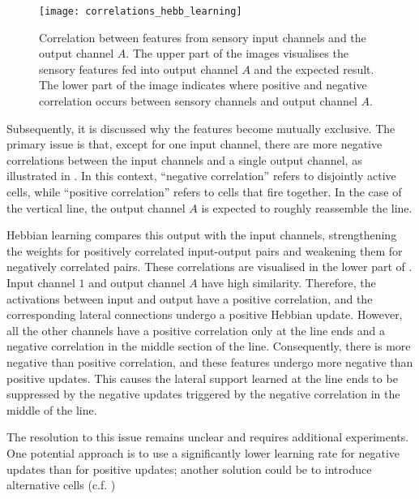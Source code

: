 \begin{figure}[h]
    \centering
    \texttt{[image: correlations\_hebb\_learning]}
    \caption[Feature correlation analysis]{Correlation between features from sensory input channels and the output channel $A$. The upper part of the images visualises the sensory features fed into output channel $A$ and the expected result. The lower part of the image indicates where positive and negative correlation occurs between sensory channels and output channel $A$.}
\end{figure}
%
Subsequently, it is discussed why the features become mutually exclusive.
The primary issue is that, except for one input channel, there are more negative correlations between the input channels and a single output channel, as illustrated in .
In this context, ``negative correlation'' refers to disjointly active cells, while ``positive correlation'' refers to cells that fire together.
In the case of the vertical line, the output channel $A$ is expected to roughly reassemble the line.

Hebbian learning compares this output with the input channels, strengthening the weights for positively correlated input-output pairs and weakening them for negatively correlated pairs.
These correlations are visualised in the lower part of .
Input channel $1$ and output channel $A$ have high similarity. Therefore, the activations between input and output have a positive correlation, and the corresponding lateral connections undergo a positive Hebbian update.
However, all the other channels have a positive correlation only at the line ends and a negative correlation in the middle section of the line.
Consequently, there is more negative than positive correlation, and these features undergo more negative than positive updates.
This causes the lateral support learned at the line ends to be suppressed by the negative updates triggered by the negative correlation in the middle of the line.

The resolution to this issue remains unclear and requires additional experiments. One potential approach is to use a significantly lower learning rate for negative updates than for positive updates; another solution could be to introduce alternative cells (c.f. )


